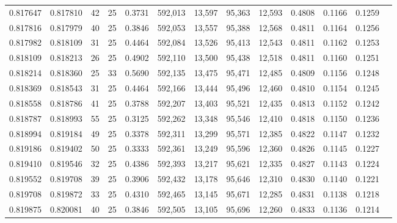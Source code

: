 \begin{tabular}{rrrrrrrrrrrrr}
0.817647 & 0.817810 &    42 &  25 &                                     0.3731 & 592,013 &  13,597 &  95,363 &  12,593 & 0.4808 & 0.1166 & 0.1259 \\
0.817816 & 0.817979 &    40 &  25 &                                     0.3846 & 592,053 &  13,557 &  95,388 &  12,568 & 0.4811 & 0.1164 & 0.1256 \\
0.817982 & 0.818109 &    31 &  25 &                                     0.4464 & 592,084 &  13,526 &  95,413 &  12,543 & 0.4811 & 0.1162 & 0.1253 \\
0.818109 & 0.818213 &    26 &  25 &                                     0.4902 & 592,110 &  13,500 &  95,438 &  12,518 & 0.4811 & 0.1160 & 0.1251 \\
0.818214 & 0.818360 &    25 &  33 &                                     0.5690 & 592,135 &  13,475 &  95,471 &  12,485 & 0.4809 & 0.1156 & 0.1248 \\
0.818369 & 0.818543 &    31 &  25 &                                     0.4464 & 592,166 &  13,444 &  95,496 &  12,460 & 0.4810 & 0.1154 & 0.1245 \\
0.818558 & 0.818786 &    41 &  25 &                                     0.3788 & 592,207 &  13,403 &  95,521 &  12,435 & 0.4813 & 0.1152 & 0.1242 \\
0.818787 & 0.818993 &    55 &  25 &                                     0.3125 & 592,262 &  13,348 &  95,546 &  12,410 & 0.4818 & 0.1150 & 0.1236 \\
0.818994 & 0.819184 &    49 &  25 &                                     0.3378 & 592,311 &  13,299 &  95,571 &  12,385 & 0.4822 & 0.1147 & 0.1232 \\
0.819186 & 0.819402 &    50 &  25 &                                     0.3333 & 592,361 &  13,249 &  95,596 &  12,360 & 0.4826 & 0.1145 & 0.1227 \\
0.819410 & 0.819546 &    32 &  25 &                                     0.4386 & 592,393 &  13,217 &  95,621 &  12,335 & 0.4827 & 0.1143 & 0.1224 \\
0.819552 & 0.819708 &    39 &  25 &                                     0.3906 & 592,432 &  13,178 &  95,646 &  12,310 & 0.4830 & 0.1140 & 0.1221 \\
0.819708 & 0.819872 &    33 &  25 &                                     0.4310 & 592,465 &  13,145 &  95,671 &  12,285 & 0.4831 & 0.1138 & 0.1218 \\
0.819875 & 0.820081 &    40 &  25 &                                     0.3846 & 592,505 &  13,105 &  95,696 &  12,260 & 0.4833 & 0.1136 & 0.1214 \\

\end{tabular}
